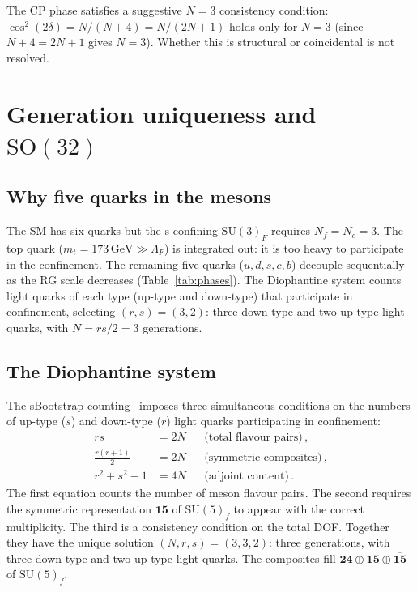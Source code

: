 \documentclass[aps,prd,twocolumn,showpacs,preprintnumbers,superscriptaddress,floatfix]{revtex4-2}
\newcommand{\SU}{\mathrm{SU}}
\newcommand{\SO}{\mathrm{SO}}
\newcommand{\Nf}{N_{\!f}}
\newcommand{\Nc}{N_{\!c}}
\newcommand{\GeV}{\,\mathrm{GeV}}
\begin{document}
The CP phase satisfies a suggestive $N = 3$ consistency condition:
$\cos^2(2\delta) = N/(N+4) = N/(2N+1)$ holds only for $N = 3$
(since $N + 4 = 2N + 1$ gives $N = 3$).
Whether this is structural or coincidental is not resolved.


\section{Generation uniqueness and $\SO(32)$}
\label{sec:SO32}

\subsection{Why five quarks in the mesons}

The SM has six quarks but the s-confining $\SU(3)_F$ requires
$\Nf = \Nc = 3$.
The top quark ($m_t = 173\GeV \gg \Lambda_F$) is integrated out:
it is too heavy to participate in the confinement.
The remaining five quarks ($u,d,s,c,b$) decouple sequentially
as the RG scale decreases (Table~\ref{tab:phases}).
The Diophantine system counts light quarks of each type
(up-type and down-type) that participate in confinement,
selecting $(r, s) = (3, 2)$: three down-type and two up-type
light quarks, with $N = rs/2 = 3$ generations.

\subsection{The Diophantine system}

The sBootstrap counting~\cite{Rivero:2024epjc} imposes three
simultaneous conditions on the numbers of up-type ($s$) and
down-type ($r$) light quarks participating in confinement:
\begin{align}
  rs &= 2N && \text{(total flavour pairs)}\,,\nonumber\\
  \frac{r(r+1)}{2} &= 2N && \text{(symmetric composites)}\,,
  \nonumber\\
  r^2 + s^2 - 1 &= 4N && \text{(adjoint content)}\,.
\end{align}
The first equation counts the number of meson flavour pairs.
The second requires the symmetric representation $\mathbf{15}$ of
$\SU(5)_f$ to appear with the correct multiplicity.
The third is a consistency condition on the total DOF.
Together they have the unique solution $(N, r, s) = (3, 3, 2)$:
three generations, with three down-type and two up-type light
quarks.
The composites fill $\mathbf{24} \oplus \mathbf{15} \oplus
\overline{\mathbf{15}}$ of $\SU(5)_f$.
\end{document}

